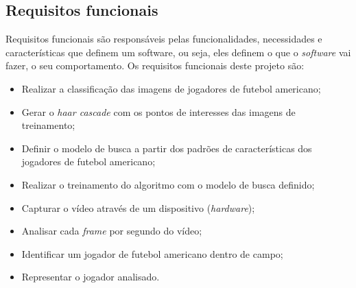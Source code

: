 \subsection{{Requisitos funcionais}}

Requisitos funcionais são responsáveis pelas funcionalidades, necessidades e características que definem um software, ou seja, eles definem o que o \textit{software} vai fazer, o seu comportamento. Os requisitos funcionais deste projeto são:

\begin{itemize}
\raggedright \item Realizar a classificação das imagens de jogadores de futebol americano;

\raggedright \item Gerar o \textit{haar cascade} com os pontos de interesses das imagens de treinamento;

\raggedright \item Definir o modelo de busca a partir dos padrões de características dos jogadores de futebol americano;

\raggedright \item Realizar o treinamento do algoritmo com o modelo de busca definido;

\raggedright \item Capturar o vídeo através de um dispositivo (\textit{hardware});

\raggedright \item Analisar cada \textit{frame} por segundo do vídeo;

\raggedright \item Identificar um jogador de futebol americano dentro de campo;

\raggedright \item Representar o jogador analisado.
\end{itemize}